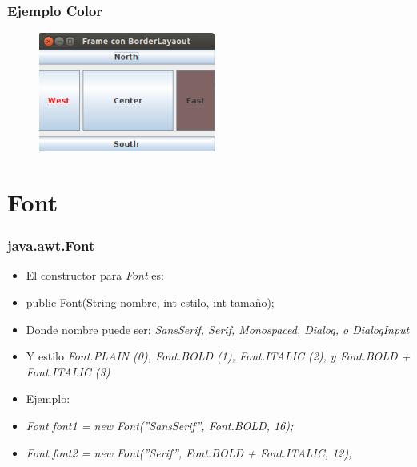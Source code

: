 \documentclass{beamer}
\begin{document}
\begin{frame}
\frametitle{Ejemplo Color} 
\begin{figure}
\includegraphics[scale=0.9]{imagenes/color.png} 
\end{figure} 
\end{frame}

\section*{Font}
\begin{frame}[fragile]
\frametitle{java.awt.Font}
\begin{itemize}[<+->]
\item El constructor para \emph{Font} es:
\item \alert{public Font(String nombre, int estilo, int tamaño);}
\item Donde nombre puede ser: \emph{SansSerif, Serif, Monospaced, Dialog, o DialogInput}
\item Y estilo \emph{Font.PLAIN (0), Font.BOLD (1), Font.ITALIC (2), y Font.BOLD + Font.ITALIC (3)}
\item Ejemplo:
\item \emph{Font font1 = new Font(''SansSerif'', Font.BOLD, 16);}
\item \emph{Font font2 = new Font(''Serif'', Font.BOLD + Font.ITALIC, 12);}
\end{itemize}
\end{frame}
\end{document}

